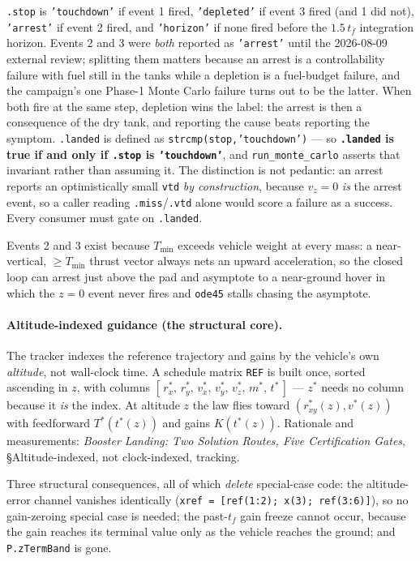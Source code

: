 \documentclass[11pt]{article}
\newcommand{\thenote}{\emph{Booster Landing: Two Solution Routes, Five
Certification Gates}}
\newcommand{\noteS}[1]{\thenote, \S#1}
\newcommand{\Tmin}{T_{\min}}
\begin{document}
\texttt{.stop} is \texttt{'touchdown'} if event 1 fired,
\texttt{'depleted'} if event 3 fired (and 1 did not), \texttt{'arrest'} if
event 2 fired, and \texttt{'horizon'} if none fired before the
$1.5\,t_f$ integration horizon. Events 2 and 3 were \emph{both} reported as
\texttt{'arrest'} until the 2026-08-09 external review; splitting them
matters because an arrest is a controllability failure with fuel still in
the tanks while a depletion is a fuel-budget failure, and the campaign's
one Phase-1 Monte Carlo failure turns out to be the latter. When both fire
at the same step, depletion wins the label: the arrest is then a
consequence of the dry tank, and reporting the cause beats reporting the
symptom. \texttt{.landed} is defined as
\texttt{strcmp(stop,'touchdown')} --- so \textbf{\texttt{.landed} is true if
and only if \texttt{.stop} is \texttt{'touchdown'}}, and
\texttt{run\_monte\_carlo} asserts that invariant rather than assuming it.
The distinction is not pedantic: an arrest reports an optimistically small
\texttt{vtd} \emph{by construction}, because $v_z = 0$ \emph{is} the arrest
event, so a caller reading \texttt{.miss}/\texttt{.vtd} alone would score a
failure as a success. Every consumer must gate on \texttt{.landed}.

Events 2 and 3 exist because $\Tmin$ exceeds vehicle weight at every mass:
a near-vertical, $\ge\Tmin$ thrust vector always nets an upward
acceleration, so the closed loop can arrest just above the pad and
asymptote to a near-ground hover in which the $z=0$ event never fires and
\texttt{ode45} stalls chasing the asymptote.

\paragraph{Altitude-indexed guidance (the structural core).} The tracker
indexes the reference trajectory and gains by the vehicle's own
\emph{altitude}, not wall-clock time. A schedule matrix \texttt{REF} is
built once, sorted ascending in $z$, with columns
$[\,r^*_x,\,r^*_y,\,v^*_x,\,v^*_y,\,v^*_z,\,m^*,\,t^*\,]$ --- $z^*$ needs no
column because it \emph{is} the index. At altitude $z$ the law flies toward
$(r^*_{xy}(z), v^*(z))$ with feedforward $T^*(t^*(z))$ and gains
$K(t^*(z))$. Rationale and measurements: \noteS{Altitude-indexed, not
clock-indexed, tracking}.

Three structural consequences, all of which \emph{delete} special-case code:
the altitude-error channel vanishes identically
(\texttt{xref = [ref(1:2); x(3); ref(3:6)]}), so no gain-zeroing special
case is needed; the past-$t_f$ gain freeze cannot occur, because the gain
reaches its terminal value only as the vehicle reaches the ground; and
\texttt{P.zTermBand} is gone.
\end{document}
